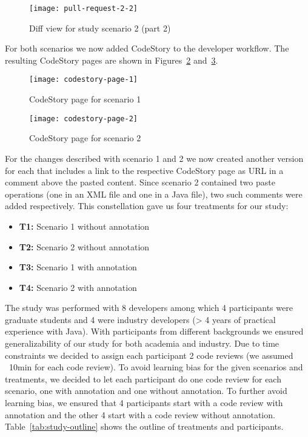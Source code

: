 \documentclass[../manifest.tex]{subfiles}
\begin{document}
\begin{figure}[h]
  \centering
  \texttt{[image: pull-request-2-2]}
  \caption{Diff view for study scenario 2 (part 2)}
  \label{fig:pull-request-2-2}
\end{figure}

For both scenarios we now added CodeStory to the developer workflow. The resulting CodeStory pages are shown in Figures~\ref{fig:codestory-page-1} and~\ref{fig:codestory-page-2}.

\begin{figure}[h]
  \centering
  \texttt{[image: codestory-page-1]}
  \caption{CodeStory page for scenario 1}
  \label{fig:codestory-page-1}
\end{figure}

\begin{figure}[h]
  \centering
  \texttt{[image: codestory-page-2]}
  \caption{CodeStory page for scenario 2}
  \label{fig:codestory-page-2}
\end{figure}

For the changes described with scenario 1 and 2 we now created another version for each that includes a link to the respective CodeStory page as URL in a comment above the pasted content. Since scenario 2 contained two paste operations (one in an XML file and one in a Java file), two such comments were added respectively. This constellation gave us four treatments for our study:
\begin{itemize}
  \item \textbf{T1:} Scenario 1 without annotation
  \item \textbf{T2:} Scenario 2 without annotation
  \item \textbf{T3:} Scenario 1 with annotation
  \item \textbf{T4:} Scenario 2 with annotation
\end{itemize}

The study was performed with 8 developers among which 4 participants were graduate students and 4 were industry developers (> 4 years of practical experience with Java). With participants from different backgrounds we ensured generalizability of our study for both academia and industry. Due to time constraints we decided to assign each participant 2 code reviews (we assumed ~10min for each code review). To avoid learning bias for the given scenarios and treatments, we decided to let each participant do one code review for each scenario, one with annotation and one without annotation. To further avoid learning bias, we ensured that 4 participants start with a code review with annotation and the other 4 start with a code review without annotation. Table~\ref{tab:study-outline} shows the outline of treatments and participants.
\end{document}
